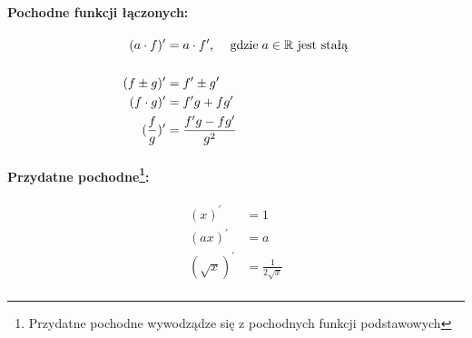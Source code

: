 \documentclass[../Matematyka.tex]{subfiles}
\begin{document}
    \paragraph{Pochodne funkcji łączonych:}
    \begin{align*}
        (a \cdot f)^\prime &= a \cdot f^\prime \text{, \quad gdzie} \; a \in \mathbb{R} \text{ jest stałą} \\
        \\
        (f \pm g)^\prime &= f^\prime \pm g^\prime \\
        (f \cdot g)^\prime &= f^\prime g + f g^\prime \\
        (\frac{f}{g})^\prime &= \frac{f^\prime g - f g^\prime}{g^2}
    \end{align*}

    \paragraph[Przydatne pochodne:]
        {Przydatne pochodne\footnote{Przydatne pochodne wywodządze się z pochodnych funkcji podstawowych}:}
    \begin{align*}
        (x)^\prime &= 1 \\
        (ax)^\prime &= a \\
        (\sqrt{x})^\prime &= \frac{1}{2\sqrt{x}} \\
    \end{align*}
\end{document}
